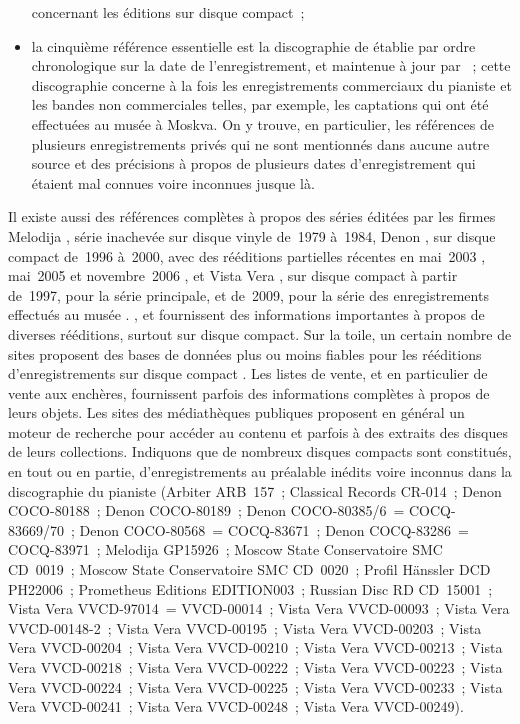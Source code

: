 \begin{itemize}
 concernant les éditions sur disque compact~;
 \item
 la cinquième référence essentielle est la discographie de \VSofronitsky{}
 établie par ordre chronologique sur la date de l'enregistrement, et
 maintenue à jour par \CJohansson{} \citep[voir][]{Johansson}~; cette
 discographie concerne à la fois les enregistrements commerciaux du pianiste
 et les bandes non commerciales telles, par exemple, les captations qui ont
 été effectuées au musée \Scriabine{} à Moskva.
 On y trouve, en particulier, les références de plusieurs enregistrements
 privés qui ne sont mentionnés dans aucune autre source et des précisions à
 propos de plusieurs dates d'enregistrement qui étaient mal connues voire
 inconnues jusque là.
\end{itemize}

Il existe aussi des références complètes à propos des séries éditées par les
firmes Melodija \citep[voir][]{Malik, Masuda, Nikonovich11, White}, série
inachevée sur disque vinyle de~1979 à~1984, Denon \citep[voir][]{Denon03,
Denon05, Denon06}, sur disque compact de~1996 à~2000, avec des rééditions
partielles récentes en mai~2003 \citep{Denon03}, mai~2005 \citep{Denon05} et
novembre~2006 \citep{Denon06}, et Vista Vera \citep[voir][]{VistaVera}, sur
disque compact à partir de~1997, pour la série principale, et de~2009, pour
la série des enregistrements effectués au musée \Scriabine{}.
\HFogel{} \citep[voir][]{Fogel}, \SGraham{} \citep[voir][]{Graham} et
\PTaylor{} \citep[voir][]{Taylor} fournissent des informations importantes à
propos de diverses rééditions, surtout sur disque compact.
Sur la toile, un certain nombre de sites proposent des bases de données plus
ou moins fiables pour les rééditions d'enregistrements sur disque compact
\citep[voir][]{Discogs.com, Freedb.org, Gracenote.com}.
Les listes de vente, et en particulier de vente aux enchères, fournissent
parfois des informations complètes à propos de leurs objets.
Les sites des médiathèques publiques proposent en général un moteur de
recherche pour accéder au contenu et parfois à des extraits des disques de
leurs collections.
Indiquons que de nombreux disques compacts sont constitués, en tout ou en
partie, d'enregistrements au préalable inédits voire inconnus dans la
discographie du pianiste (Arbiter ARB~157~; Classical Records CR-014~; Denon
COCO-80188~; Denon COCO-80189~; Denon COCO-80385/6~= COCQ-83669/70~; Denon
COCO-80568~= COCQ-83671~; Denon COCQ-83286~= COCQ-83971~; Melodija GP15926~;
Moscow State Conservatoire SMC CD~0019~; Moscow State Conservatoire SMC
CD~0020~; Profil Hänssler DCD PH22006~; Prometheus Editions EDITION003~;
Russian Disc RD CD~15001~; Vista Vera VVCD-97014~= VVCD-00014~; Vista Vera
VVCD-00093~; Vista Vera VVCD-00148-2~; Vista Vera VVCD-00195~; Vista Vera
VVCD-00203~; Vista Vera VVCD-00204~; Vista Vera VVCD-00210~; Vista Vera
VVCD-00213~; Vista Vera VVCD-00218~; Vista Vera VVCD-00222~; Vista Vera
VVCD-00223~; Vista Vera VVCD-00224~; Vista Vera VVCD-00225~; Vista Vera
VVCD-00233~; Vista Vera VVCD-00241~; Vista Vera VVCD-00248~; Vista Vera
VVCD-00249).

